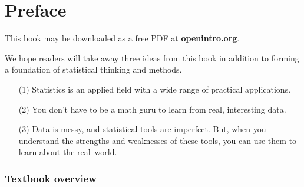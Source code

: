 \chapter*{Preface}



This book may be downloaded as a free PDF at \href{http://www.openintro.org}{\color{black}\textbf{openintro.org}}. %
\vspace{3mm}

\noindent We hope readers will take away three ideas from this book in addition to forming a foundation of statistical thinking and methods.\vspace{-1mm}
\begin{enumerate}
\setlength{\itemsep}{0mm}
\item[(1)] Statistics is an applied field with a wide range of practical applications.
\item[(2)] You don't have to be a math guru to learn from real, interesting data.
\item[(3)] Data is messy, and statistical tools are imperfect. But, when you understand the strengths and weaknesses of these tools, you can use them to learn about the real~world.
\end{enumerate}


\subsection*{Textbook overview}

